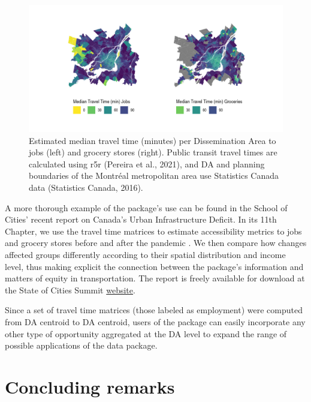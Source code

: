 \documentclass[Royal,times,sageh]{sagej}
\begin{document}
\begin{figure}[H]
\includegraphics[width=1\linewidth]{../figures/patch_tt_emp_grc} \caption{Estimated median travel time (minutes) per Dissemination Area to jobs (left) and grocery stores (right). Public transit travel times are calculated using {r5r} (Pereira et al., 2021), and DA and planning boundaries of the Montréal metropolitan area use Statistics Canada data (Statistics Canada, 2016).}\label{fig:fig-travel_time_emp_grc_plot}
\end{figure}

A more thorough example of the package's use can be found in the School
of Cities' recent report on Canada's Urban Infrastructure Deficit. In
its 11th Chapter, we use the travel time matrices to estimate
accessibility metrics to jobs and grocery stores before and after the
pandemic \citep{pargaDemocraticAccessOur2024}. We then compare how
changes affected groups differently according to their spatial
distribution and income level, thus making explicit the connection
between the package's information and matters of equity in
transportation. The report is freely available for download at the State
of Cities Summit \href{https://stateofcitiessummit.ca/report}{website}.

Since a set of travel time matrices (those labeled as employment) were
computed from DA centroid to DA centroid, users of the package can
easily incorporate any other type of opportunity aggregated at the DA
level to expand the range of possible applications of the data package.

\section{Concluding remarks}\label{concluding-remarks}
\end{document}

